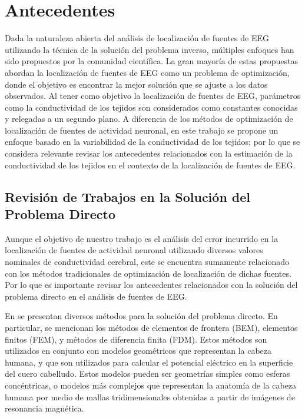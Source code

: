 %
\chapter{Antecedentes}
\label{sec:related}

Dada la naturaleza abierta del análisis de localización de fuentes de EEG utilizando la técnica de la solución del problema inverso, múltiples enfoques han sido propuestos por la comunidad científica.
La gran mayoría de estas propuestas abordan la localización de fuentes de EEG como un problema de optimización, donde el objetivo es encontrar la mejor solución que se ajuste a los datos observados.
Al tener como objetivo la localización de fuentes de EEG, parámetros como la conductividad de los tejidos son considerados como constantes conocidas y relegadas a un segundo plano.
A diferencia de los métodos de optimización de localización de fuentes de actividad neuronal, en este trabajo se propone un enfoque basado en la variabilidad de la conductividad de los tejidos; por lo que se considera relevante revisar los antecedentes relacionados con la estimación de la conductividad de los tejidos en el contexto de la localización de fuentes de EEG.

\section{Revisión de Trabajos en la Solución del Problema Directo}
\label{sec:related:hallez}

Aunque el objetivo de nuestro trabajo es el análisis del error incurrido en la localización de fuentes de actividad neuronal utilizando diversos valores nominales de conductividad cerebral, este se encuentra sumamente relacionado con los métodos tradicionales de optimización de localización de dichas fuentes.
Por lo que es importante revisar los antecedentes relacionados con la solución del problema directo en el análisis de fuentes de EEG.

En \cite{Hallez2007} se presentan diversos métodos para la solución del problema directo. En particular, se mencionan los métodos de elementos de frontera (BEM), elementos finitos (FEM), y métodos de diferencia finita (FDM).
Estos métodos son utilizados en conjunto con modelos geométricos que representan la cabeza humana, y que son utilizados para calcular el potencial eléctrico en la superficie del cuero cabelludo.
Estos modelos pueden ser geometrías simples como esferas concéntricas, o modelos más complejos que representan la anatomía de la cabeza humana por medio de mallas tridimensionales obtenidas a partir de imágenes de resonancia magnética.

